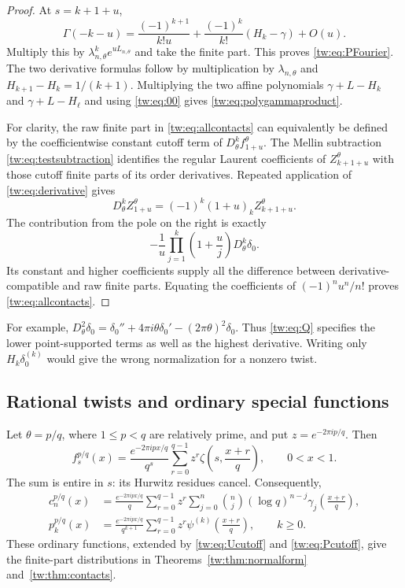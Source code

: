 \begin{proof}
At $s=k+1+u$,
\[
 \Gamma(-k-u)
 =\frac{(-1)^{k+1}}{k!u}
       +\frac{(-1)^k}{k!}(H_k-\gamma)+O(u).
\]
Multiply this by
$\lambda_{n,\theta}^ke^{uL_{n,\theta}}$ and take the finite part.
This proves \eqref{tw:eq:PFourier}. The two derivative formulas
follow by multiplication by $\lambda_{n,\theta}$ and
$H_{k+1}-H_k=1/(k+1)$. Multiplying the two affine polynomials
$\gamma+L-H_k$ and $\gamma+L-H_\ell$ and using
\eqref{tw:eq:00} gives \eqref{tw:eq:polygammaproduct}.

For clarity, the raw finite part in \eqref{tw:eq:allcontacts} can
equivalently be defined by the coefficientwise constant cutoff term
of $D_\theta^kf_{1+u}^\theta$. The Mellin subtraction
\eqref{tw:eq:testsubtraction} identifies the regular Laurent
coefficients of $Z_{k+1+u}^\theta$ with those cutoff finite parts
of its order derivatives. Repeated application of
\eqref{tw:eq:derivative} gives
\[
 D_\theta^kZ_{1+u}^\theta
          =(-1)^k(1+u)_kZ_{k+1+u}^\theta.
\]
The contribution from the pole on the right is exactly
\[
 -\frac{1}{u}\prod_{j=1}^k\left(1+\frac{u}{j}\right)
                  D_\theta^k\delta_0.
\]
Its constant and higher coefficients supply all the difference
between derivative-compatible and raw finite parts. Equating
the coefficients of $(-1)^nu^n/n!$ proves
\eqref{tw:eq:allcontacts}.
\end{proof}

For example, $D_\theta^2\delta_0=\delta_0''+
4\pi i\theta\delta_0'-(2\pi\theta)^2\delta_0$. Thus
\eqref{tw:eq:Q} specifies the lower point-supported terms as well
as the highest derivative. Writing only $H_k\delta_0^{(k)}$ would
give the wrong normalization for a nonzero twist.

\subsection{Rational twists and ordinary special functions}

\begin{proposition}\label{tw:prop:rational}
Let $\theta=p/q$, where $1\le p<q$ are relatively prime, and put
$z=e^{-2\pi ip/q}$. Then
\begin{equation}\label{tw:eq:rationalLerch}
 f_s^{p/q}(x)=\frac{e^{-2\pi ipx/q}}{q^s}
          \sum_{r=0}^{q-1}z^r\zeta\left(s,\frac{x+r}{q}\right),
 \qquad 0<x<1.
\end{equation}
The sum is entire in $s$: its Hurwitz residues cancel. Consequently,
\begin{align}
 c_n^{p/q}(x)
 &=\frac{e^{-2\pi ipx/q}}q
       \sum_{r=0}^{q-1}z^r\sum_{j=0}^n\binom nj
        (\log q)^{n-j}\gamma_j\left(\frac{x+r}{q}\right),
 \label{tw:eq:rationalStieltjes}\\
 p_k^{p/q}(x)
 &=\frac{e^{-2\pi ipx/q}}{q^{k+1}}
       \sum_{r=0}^{q-1}z^r\psi^{(k)}\left(\frac{x+r}{q}\right),
       \qquad k\ge0.\label{tw:eq:rationalPolygamma}
\end{align}
These ordinary functions, extended by
\eqref{tw:eq:Ucutoff} and \eqref{tw:eq:Pcutoff}, give the
finite-part distributions in Theorems~\ref{tw:thm:normalform}
and~\ref{tw:thm:contacts}.
\end{proposition}

